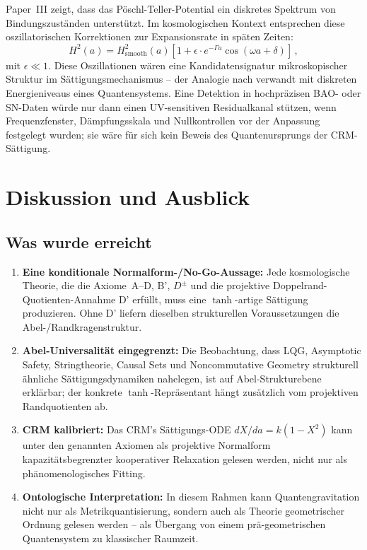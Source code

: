 \documentclass[aps,prd,twocolumn,superscriptaddress,nofootinbib]{revtex4-2}
\begin{document}
Paper~III \cite{Geiger2026c} zeigt, dass das Pöschl-Teller-Potential ein diskretes Spektrum von Bindungszuständen unterstützt. Im kosmologischen Kontext entsprechen diese oszillatorischen Korrektionen zur Expansionsrate in späten Zeiten:
\begin{equation}
H^2(a) = H_{\mathrm{smooth}}^2(a)\left[1 + \epsilon \cdot e^{-\Gamma a} \cos(\omega a + \delta)\right]\,,
\end{equation}
mit $\epsilon \ll 1$. Diese Oszillationen wären eine Kandidatensignatur mikroskopischer Struktur im Sättigungsmechanismus -- der Analogie nach verwandt mit diskreten Energieniveaus eines Quantensystems. Eine Detektion in hochpräzisen BAO- oder SN-Daten würde nur dann einen UV-sensitiven Residualkanal stützen, wenn Frequenzfenster, Dämpfungsskala und Nullkontrollen vor der Anpassung festgelegt wurden; sie wäre für sich kein Beweis des Quantenursprungs der CRM-Sättigung.


\section{Diskussion und Ausblick}
\label{sec:discussion}

\subsection{Was wurde erreicht}

\begin{enumerate}
\item \textbf{Eine konditionale Normalform-/No-Go-Aussage:} Jede kosmologische Theorie, die die Axiome~A--D, B', $D^\pm$ und die projektive Doppelrand-Quotienten-Annahme D' erfüllt, muss eine $\tanh$-artige Sättigung produzieren. Ohne D' liefern dieselben strukturellen Voraussetzungen die Abel-/Randkragenstruktur.

\item \textbf{Abel-Universalität eingegrenzt:} Die Beobachtung, dass LQG, Asymptotic Safety, Stringtheorie, Causal Sets und Noncommutative Geometry strukturell ähnliche Sättigungsdynamiken nahelegen, ist auf Abel-Strukturebene erklärbar; der konkrete $\tanh$-Repräsentant hängt zusätzlich vom projektiven Randquotienten ab.

\item \textbf{CRM kalibriert:} Das CRM's Sättigungs-ODE $dX/da = k(1-X^2)$ kann unter den genannten Axiomen als projektive Normalform kapazitätsbegrenzter kooperativer Relaxation gelesen werden, nicht nur als phänomenologisches Fitting.

\item \textbf{Ontologische Interpretation:} In diesem Rahmen kann Quantengravitation nicht nur als Metrikquantisierung, sondern auch als Theorie geometrischer Ordnung gelesen werden -- als Übergang von einem prä-geometrischen Quantensystem zu klassischer Raumzeit.
\end{enumerate}
\end{document}
